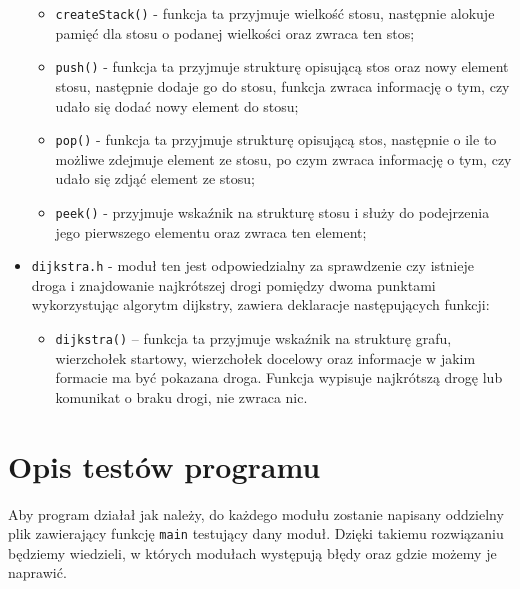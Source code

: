 \documentclass[]{article}
\begin{document}
\begin{itemize}
\begin{itemize}
\item
\texttt{createStack()} - funkcja ta przyjmuje wielkość stosu, następnie alokuje pamięć dla stosu o podanej wielkości oraz zwraca ten stos;
\item
\texttt{push()} - funkcja ta przyjmuje strukturę opisującą stos oraz nowy element stosu, następnie dodaje go do stosu, funkcja zwraca informację o tym, czy udało się dodać nowy element do stosu;
\item
\texttt{pop()} - funkcja ta przyjmuje strukturę opisującą stos, następnie o ile to możliwe zdejmuje element ze stosu, po czym zwraca informację o tym, czy udało się zdjąć element ze stosu;
\item
\texttt{peek()} - przyjmuje wskaźnik na strukturę stosu i służy do podejrzenia jego pierwszego elementu oraz zwraca ten element; 
\end{itemize}
\item
\texttt{dijkstra.h} - moduł ten jest odpowiedzialny za sprawdzenie czy istnieje droga i znajdowanie najkrótszej drogi pomiędzy dwoma punktami wykorzystując algorytm dijkstry, zawiera deklaracje następujących funkcji:
\begin{itemize}
\item
\texttt{dijkstra()} – funkcja ta przyjmuje wskaźnik na strukturę grafu, wierzchołek startowy, wierzchołek docelowy oraz informacje w jakim formacie ma być pokazana droga. Funkcja wypisuje najkrótszą drogę lub komunikat o braku drogi, nie zwraca nic.

\end{itemize} 
\end{itemize}




\section{Opis testów programu}\label{header-n281}
Aby program działał jak należy, do każdego modułu zostanie napisany oddzielny plik zawierający funkcję \texttt{main} testujący dany moduł. Dzięki takiemu rozwiązaniu będziemy wiedzieli, w których modułach występują błędy oraz gdzie możemy je naprawić.
\end{document}
